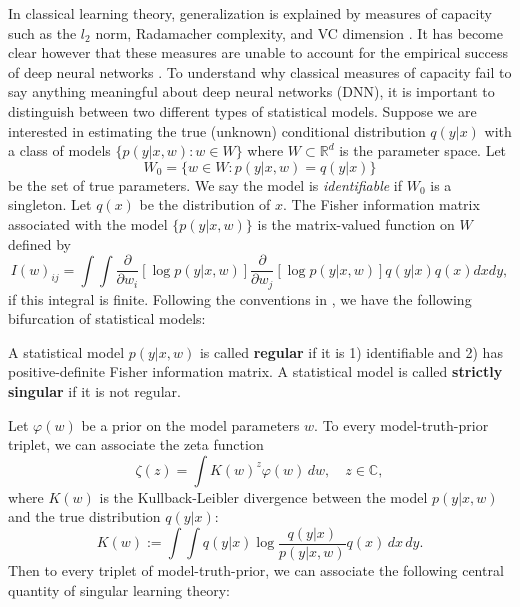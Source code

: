 \documentclass{article} %
\begin{document}
In classical learning theory, generalization is explained by measures of capacity such as the $l_2$ norm, Radamacher complexity, and VC dimension \citep{bousquet2002.5introduction}. It has become clear however that these measures are unable to account for the empirical success of deep neural networks \citep{zhang_understanding_2017}. 
To understand why classical measures of capacity fail to say anything meaningful about deep neural networks (DNN), it is important to distinguish between two different types of statistical models. Suppose we are interested in estimating the true (unknown) conditional distribution $q(y|x)$ with a class of models $\{p(y|x,w): w \in W\}$ where $W \subset \mathbb R^d$ is the parameter space. Let 
$$
W_0 = \{w \in W: p(y|x,w)=q(y|x)\}
$$
 be the set of true parameters. We say the model is \textit{identifiable} if $W_0$ is a singleton. Let $q(x)$ be the distribution of $x$. The Fisher information matrix associated with the model $\{p(y|x,w)\}$ is the matrix-valued function on $W$ defined by
 \begin{equation*}
 I(w)_{ij} = \int\!\int \frac{\partial}{\partial w_i}[ \log p(y|x,w) ] \frac{\partial}{\partial w_j}[ \log p(y|x,w) ] q(y|x) q(x) dx dy,
 \label{eq:FIM}
 \end{equation*}
if this integral is finite. 
Following the conventions in \cite{watanabe_algebraic_2009}, we have the following bifurcation of statistical models:
\begin{definition}
A statistical model $p(y|x,w)$ is called \textbf{regular} if it is 1) identifiable and 2) has positive-definite Fisher information matrix. A statistical model is called \textbf{strictly singular} if it is not regular. 
\end{definition}


Let  $\varphi(w)$ be a prior on the model parameters $w$.
To every model-truth-prior triplet, we can associate the zeta function
\begin{equation}
\zeta(z) = \int K(w)^z \varphi(w) \,dw, \quad z \in \mathbb C,
\end{equation} 
where $K(w)$ is the Kullback-Leibler divergence between the model $p(y|x,w)$ and the true distribution $q(y|x)$:
\begin{equation}
    K(w) := \int \!\int q(y|x) \log \frac{ q(y|x) }{ p(y|x,w) } q(x) \,dx \,dy.
\end{equation}
Then to every triplet of model-truth-prior, we can associate the following central quantity of singular learning theory:
\end{document}
